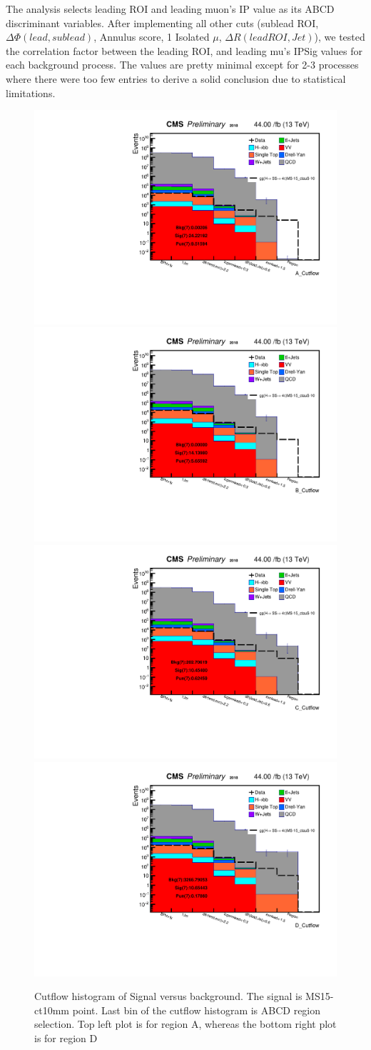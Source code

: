 The analysis selects leading ROI and leading muon's IP value as its ABCD discriminant variables.
After implementing all other cuts (sublead ROI, $\Delta\Phi(lead,sublead)$, Annulus score, 1 Isolated $\mu$, $\Delta R(lead ROI, Jet)$), we tested the correlation factor between the leading ROI, and leading mu's IPSig values for each background process.
The values are pretty minimal except for 2-3 processes where there were too few entries to derive a solid conclusion due to statistical limitations.
 \begin{figure}[h!]
   \label{fig:ABmethod}
   \centering
   \includegraphics[width=0.47\linewidth]{figs/log_Oct6CutflAnalysisNote_MS-15_ctauS-10_A_Cutflow.pdf}
   \includegraphics[width=0.47\linewidth]{figs/log_Oct6CutflAnalysisNote_MS-15_ctauS-10_B_Cutflow.pdf}
   \includegraphics[width=0.47\linewidth]{figs/log_Oct6CutflAnalysisNote_MS-15_ctauS-10_C_Cutflow.pdf}
   \includegraphics[width=0.47\linewidth]{figs/log_Oct6CutflAnalysisNote_MS-15_ctauS-10_D_Cutflow.pdf}
   \caption{Cutflow histogram of Signal versus background. The signal is MS15\GeV-ct10mm point. Last bin of the cutflow histogram is ABCD region selection. Top left plot is for region A, whereas the bottom right plot is for region D}
 \end{figure}

